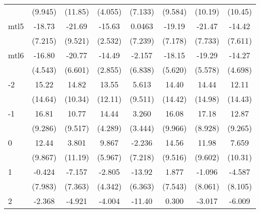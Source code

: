 \documentclass{article}
\begin{document}
{\begin{longtable}{l*{7}{c}}
                &  (9.945)         &  (11.85)         &  (4.055)         &  (7.133)         &  (9.584)         &  (10.19)         &  (10.45)         \\
mtl5            &   -18.73\sym{*}  &   -21.69\sym{*}  &   -15.63\sym{***}&   0.0463         &   -19.19\sym{*}  &   -21.47\sym{*}  &   -14.42         \\
                &  (7.215)         &  (9.521)         &  (2.532)         &  (7.239)         &  (7.178)         &  (7.733)         &  (7.611)         \\
mtl6            &   -16.80\sym{**} &   -20.77\sym{**} &   -14.49\sym{***}&   -2.157         &   -18.15\sym{**} &   -19.29\sym{**} &   -14.27\sym{**} \\
                &  (4.543)         &  (6.601)         &  (2.855)         &  (6.838)         &  (5.620)         &  (5.578)         &  (4.698)         \\
-2              &    15.22         &    14.82         &    13.55         &    5.613         &    14.40         &    14.44         &    12.11         \\
                &  (14.64)         &  (10.34)         &  (12.11)         &  (9.511)         &  (14.42)         &  (14.98)         &  (14.43)         \\
-1              &    16.81         &    10.77         &    14.44\sym{**} &    3.260         &    16.08         &    17.18         &    12.87         \\
                &  (9.286)         &  (9.517)         &  (4.289)         &  (3.444)         &  (9.966)         &  (8.928)         &  (9.265)         \\
0               &    12.44         &    3.801         &    9.867         &   -2.236         &    14.56         &    11.98         &    7.659         \\
                &  (9.867)         &  (11.19)         &  (5.967)         &  (7.218)         &  (9.516)         &  (9.602)         &  (10.31)         \\
1               &   -0.424         &   -7.157         &   -2.805         &   -13.92\sym{*}  &    1.877         &   -1.096         &   -4.587         \\
                &  (7.983)         &  (7.363)         &  (4.342)         &  (6.363)         &  (7.543)         &  (8.061)         &  (8.105)         \\
2               &   -2.368         &   -4.921         &   -4.004         &   -11.40         &    0.300         &   -3.017         &   -6.009         \\

\end{longtable}}
\end{document}
